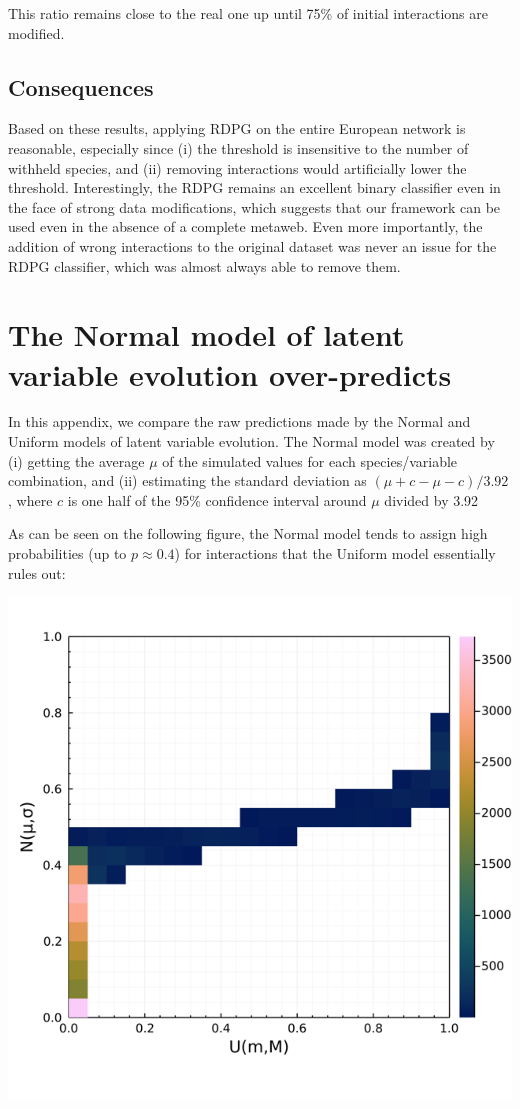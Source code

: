 This ratio remains close to the real one up until 75\% of initial
interactions are modified.

\subsection{Consequences}\label{consequences}

Based on these results, applying RDPG on the entire European network is
reasonable, especially since (i) the threshold is insensitive to the
number of withheld species, and (ii) removing interactions would
artificially lower the threshold. Interestingly, the RDPG remains an
excellent binary classifier even in the face of strong data
modifications, which suggests that our framework can be used even in the
absence of a complete metaweb. Even more importantly, the addition of
wrong interactions to the original dataset was never an issue for the
RDPG classifier, which was almost always able to remove them.

\section{The Normal model of latent variable evolution
over-predicts}\label{the-normal-model-of-latent-variable-evolution-over-predicts}

In this appendix, we compare the raw predictions made by the Normal and
Uniform models of latent variable evolution. The Normal model was
created by (i) getting the average \(\mu\) of the simulated values for
each species/variable combination, and (ii) estimating the standard
deviation as \((\mu+c - \mu-c)/3.92\), where \(c\) is one half of the
95\% confidence interval around \(\mu\) divided by 3.92

As can be seen on the following figure, the Normal model tends to assign
high probabilities (up to \(p \approx 0.4\)) for interactions that the
Uniform model essentially rules out:

\includegraphics[width=\textwidth]{./figures/supplementary/comparison_models.png}

